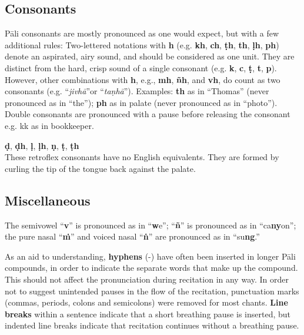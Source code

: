 
\subsection*{Consonants}

Pāli consonants are mostly pronounced as one would expect, but with a few additional rules:  Two-lettered notations with \textbf{h} (e.g. \textbf{kh}, \textbf{ch}, \textbf{ṭh}, \textbf{th}, \textbf{ḷh}, \textbf{ph}) denote an aspirated, airy sound, and should be considered as one unit. They are distinct from the hard, crisp sound of a single consonant (e.g. \textbf{k}, \textbf{c}, \textbf{ṭ}, \textbf{t}, \textbf{p}). However, other combinations with \textbf{h}, e.g., \textbf{mh}, \textbf{ñh}, and \textbf{vh}, do count as two consonants (e.g. ``\textit{jivhā}''or ``\textit{taṇhā}'').  Examples: \textbf{th} as in ``Thomas'' (never pronounced as in ``the''); \textbf{ph} as in palate (never pronounced as in ``photo''). \ifninebythirteen\clearpage\fi Double consonants are pronounced with a pause before releasing the consonant e.g. kk as in bookkeeper.

\textbf{ḍ}, \textbf{ḍh}, \textbf{ḷ}, \textbf{ḷh}, \textbf{ṇ}, \textbf{ṭ}, \textbf{ṭh}\\
These retroflex consonants have no English equivalents. They are formed by curling the tip of the tongue back against the palate.

\ifafive\clearpage\fi

\subsection*{Miscellaneous}

The semivowel ``\textbf{v}'' is pronounced as in ``\textbf{w}e''; ``\textbf{ñ}'' is pronounced as in ``ca\textbf{ny}on''; the pure nasal ``\textbf{ṁ}'' and voiced nasal ``\textbf{ṅ}'' are pronounced as in ``su\textbf{ng}.''

As an aid to understanding, \textbf{hyphens} (-) have often been inserted in longer Pāli compounds, in order to indicate the separate words that make up the compound. This should not affect the pronunciation during recitation in any way. In order not to suggest unintended pauses in the flow of the recitation, punctuation marks (commas, periods, colons and semicolons) were removed for most chants. \textbf{Line breaks} within a sentence indicate that a short breathing pause is inserted, but indented line breaks indicate that recitation continues without a breathing pause.

